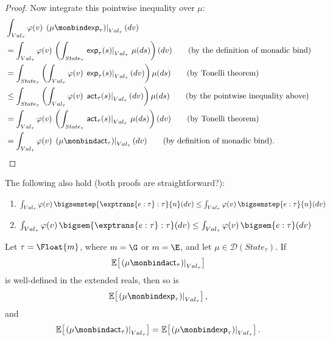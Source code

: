 \begin{proof}
  Now integrate this pointwise inequality over
  $\mu$:
  \begin{align}
    &\int_{Val_\tau}
      \varphi(v)\,
      \left.
        (\mu\monbind\mathsf{exp}_\tau)
      \right|_{Val_\tau}(dv)
    \notag
    \\
    &=
    \int_{Val_\tau}
      \varphi(v)\,
      \left(
        \int_{State_\tau}
          \left.\mathsf{exp}_\tau(s)\right|_{Val_\tau}
          \,\mu(ds)
      \right)(dv)
    \tag{\text{by the definition of monadic bind}}
    \\
    &=
    \int_{State_\tau}
      \left(
        \int_{Val_\tau}
          \varphi(v)\,
          \left.\mathsf{exp}_\tau(s)\right|_{Val_\tau}(dv)
      \right)
      \mu(ds)
    \tag{\text{by Tonelli theorem}}
    \\
    &\leq
    \int_{State_\tau}
      \left(
        \int_{Val_\tau}
          \varphi(v)\,
          \left.\mathsf{act}_\tau(s)\right|_{Val_\tau}(dv)
      \right)
      \mu(ds)
    \tag{\text{by the pointwise inequality above}}
    \\
    &=
    \int_{Val_\tau}
      \varphi(v)\,
      \left(
        \int_{State_\tau}
          \left.\mathsf{act}_\tau(s)\right|_{Val_\tau}
          \,\mu(ds)
      \right)(dv)
    \tag{\text{by Tonelli theorem}}
    \\
    &=
    \int_{Val_\tau}
      \varphi(v)\,
      \left.
        (\mu\monbind\mathsf{act}_\tau)
      \right|_{Val_\tau}(dv)
    \tag{by definition of monadic bind}.
  \end{align}
\end{proof}

The following also hold (both proofs are straightforward?):
\begin{enumerate}
  \item $\int_{Val_\tau}
  \varphi(v)\,
  \bigsemstep{\exptrans{e:\tau}:\tau}{n}(dv)
  \leq
  \int_{Val_\tau}
  \varphi(v)\,
  \bigsemstep{e:\tau}{n}(dv)$

  \item $\int_{Val_\tau}
  \varphi(v)\,
  \bigsem{\exptrans{e:\tau}:\tau}(dv)
  \leq
  \int_{Val_\tau}
  \varphi(v)\,
  \bigsem{e:\tau}(dv)$
\end{enumerate}


\begin{theorem}
  \label{thm:global-agreement-of-interpretations}
  Let $\tau=\Float{m}$, where $m=\G$ or $m=\E$, and let $\mu \in \mathcal{D}(State_\tau)$. If
  \[
    \mathbb E\!\left[
      \left.
        (\mu\monbind\mathsf{act}_\tau)
      \right|_{Val_\tau}
    \right]
  \]
  is well-defined in the extended reals, then so is
  \[
    \mathbb E\!\left[
      \left.
        (\mu\monbind\mathsf{exp}_\tau)
      \right|_{Val_\tau}
    \right],
  \]
  and
  \[
    \mathbb E\!\left[
      \left.
        (\mu\monbind\mathsf{act}_\tau)
      \right|_{Val_\tau}
    \right]
    =
    \mathbb E\!\left[
      \left.
        (\mu\monbind\mathsf{exp}_\tau)
      \right|_{Val_\tau}
    \right].
  \]
\end{theorem}


